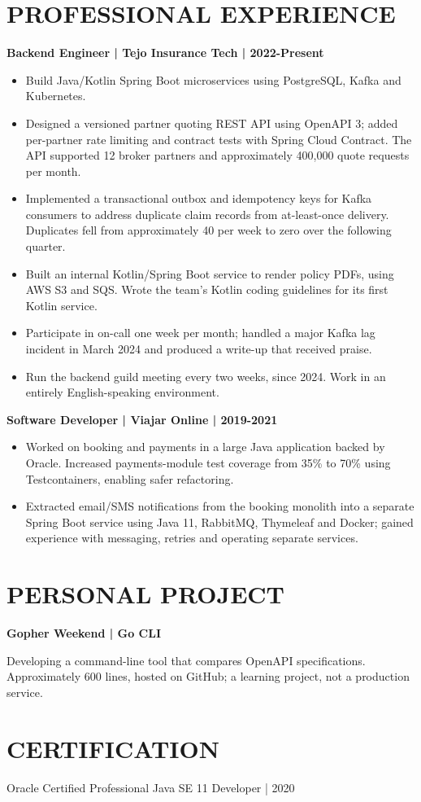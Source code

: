\documentclass[11pt,a4paper]{article}
\newcommand{\cvsection}[1]{\section*{#1}}
\begin{document}
\cvsection{PROFESSIONAL EXPERIENCE}
\textbf{Backend Engineer | Tejo Insurance Tech | 2022-Present}
\begin{itemize}
\item Build Java/Kotlin Spring Boot microservices using PostgreSQL, Kafka and Kubernetes.
\item Designed a versioned partner quoting REST API using OpenAPI 3; added per-partner rate limiting and contract tests with Spring Cloud Contract. The API supported 12 broker partners and approximately 400,000 quote requests per month.
\item Implemented a transactional outbox and idempotency keys for Kafka consumers to address duplicate claim records from at-least-once delivery. Duplicates fell from approximately 40 per week to zero over the following quarter.
\item Built an internal Kotlin/Spring Boot service to render policy PDFs, using AWS S3 and SQS. Wrote the team's Kotlin coding guidelines for its first Kotlin service.
\item Participate in on-call one week per month; handled a major Kafka lag incident in March 2024 and produced a write-up that received praise.
\item Run the backend guild meeting every two weeks, since 2024. Work in an entirely English-speaking environment.
\end{itemize}
\textbf{Software Developer | Viajar Online | 2019-2021}
\begin{itemize}
\item Worked on booking and payments in a large Java application backed by Oracle. Increased payments-module test coverage from 35\% to 70\% using Testcontainers, enabling safer refactoring.
\item Extracted email/SMS notifications from the booking monolith into a separate Spring Boot service using Java 11, RabbitMQ, Thymeleaf and Docker; gained experience with messaging, retries and operating separate services.
\end{itemize}

\cvsection{PERSONAL PROJECT}
\textbf{Gopher Weekend | Go CLI}\par
Developing a command-line tool that compares OpenAPI specifications. Approximately 600 lines, hosted on GitHub; a learning project, not a production service.

\cvsection{CERTIFICATION}
Oracle Certified Professional Java SE 11 Developer | 2020
\end{document}
